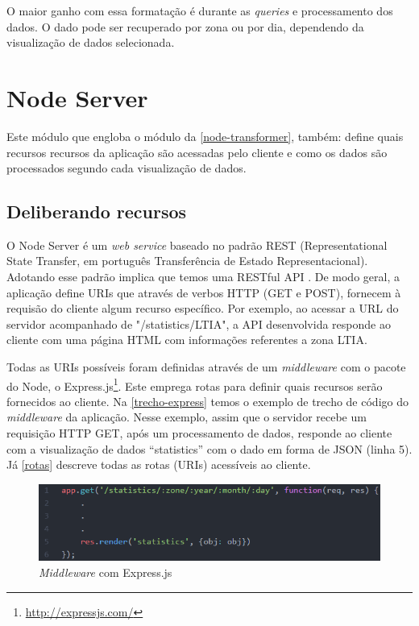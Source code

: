 O maior ganho com essa formatação é durante as \emph{queries} e processamento dos dados. O dado pode ser recuperado
por zona ou por dia, dependendo da visualização de dados selecionada.

\section{Node Server}
\label{node-server}
Este módulo que engloba o módulo da \autoref{node-transformer}, também: define
quais recursos recursos da aplicação são acessadas pelo cliente e como os dados
são processados segundo cada visualização de dados.

\subsection{Deliberando recursos}
O Node Server é um \emph{web service} baseado no padrão REST (Representational
State Transfer, em português Transferência de Estado Representacional). Adotando
esse padrão implica que temos uma RESTful API \cite{pires2017}. De modo geral, a aplicação define
URIs que através de verbos HTTP (GET e POST), fornecem à requisão do cliente
algum recurso específico. Por exemplo, ao acessar a URL do servidor acompanhado de "/statistics/LTIA", a API
desenvolvida responde ao cliente com uma página HTML com informações referentes a zona LTIA.

Todas as URIs possíveis foram definidas através de um \emph{middleware} com o
pacote do Node, o Express.js\footnote{\url{http://expressjs.com/}}. Este emprega rotas para definir quais recursos
serão fornecidos ao cliente. Na \autoref{trecho-express} temos o exemplo de trecho de código do \emph{middleware} da
aplicação. Nesse exemplo, assim que o servidor recebe um requisição HTTP GET, após um processamento de dados, responde
ao cliente com a visualização de dados ``statistics'' com o dado em forma de JSON (linha 5). Já \autoref{rotas} descreve
todas as rotas (URIs) acessíveis ao cliente.

\begin{figure}[!h]
  \caption{\label{trecho-express}\emph{Middleware} com Express.js}
  \begin{center}
    \includegraphics[width=1.0\textwidth]{img/trecho-express.png}
  \end{center}
\end{figure}


